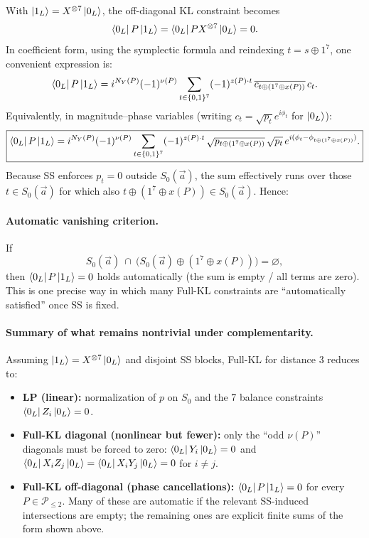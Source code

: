 \documentclass[11pt]{article}
\begin{document}
With \(\ket{1_L}=X^{\otimes 7}\ket{0_L}\), the off-diagonal KL constraint becomes
\[
\bra{0_L}P\ket{1_L}=\bra{0_L}P X^{\otimes 7}\ket{0_L}=0.
\]
In coefficient form, using the symplectic formula and reindexing \(t=s\oplus 1^7\), one convenient expression is:
\[
\bra{0_L}P\ket{1_L}
=
i^{N_Y(P)}(-1)^{\nu(P)}
\sum_{t\in\{0,1\}^7}
(-1)^{z(P)\cdot t}\,
\overline{c_{t\oplus(1^7\oplus x(P))}}\,c_{t}.
\]
Equivalently, in magnitude--phase variables (writing \(c_t=\sqrt{p_t}e^{i\phi_t}\) for \(\ket{0_L}\)):
\[
\boxed{
\bra{0_L}P\ket{1_L}
=
i^{N_Y(P)}(-1)^{\nu(P)}
\sum_{t\in\{0,1\}^7}
(-1)^{z(P)\cdot t}\,
\sqrt{p_{t\oplus(1^7\oplus x(P))}}\,\sqrt{p_t}\,
e^{i(\phi_t-\phi_{t\oplus(1^7\oplus x(P))})}.
}
\]
Because SS enforces \(p_t=0\) outside \(S_0(\vec a)\), the sum effectively runs over those
\(t\in S_0(\vec a)\) for which also \(t\oplus(1^7\oplus x(P))\in S_0(\vec a)\).
Hence:

\paragraph{Automatic vanishing criterion.}
If
\[
S_0(\vec a)\ \cap\ \bigl(S_0(\vec a)\oplus(1^7\oplus x(P))\bigr)=\varnothing,
\]
then \(\bra{0_L}P\ket{1_L}=0\) holds automatically (the sum is empty / all terms are zero).
This is one precise way in which many Full-KL constraints are ``automatically satisfied'' once SS is fixed.

\paragraph{Summary of what remains nontrivial under complementarity.}
Assuming \(\ket{1_L}=X^{\otimes 7}\ket{0_L}\) and disjoint SS blocks, Full-KL for distance \(3\) reduces to:
\begin{itemize}
\item \textbf{LP (linear):} normalization of \(p\) on \(S_0\) and the 7 balance constraints \(\bra{0_L}Z_i\ket{0_L}=0\).
\item \textbf{Full-KL diagonal (nonlinear but fewer):} only the ``odd \(\nu(P)\)'' diagonals must be forced to zero:
\(\bra{0_L}Y_i\ket{0_L}=0\) and \(\bra{0_L}X_iZ_j\ket{0_L}=\bra{0_L}X_iY_j\ket{0_L}=0\) for \(i\neq j\).
\item \textbf{Full-KL off-diagonal (phase cancellations):} \(\bra{0_L}P\ket{1_L}=0\) for every \(P\in\mathcal{P}_{\le 2}\).
Many of these are automatic if the relevant SS-induced intersections are empty; the remaining ones are explicit finite sums
of the form shown above.
\end{itemize}
\end{document}

